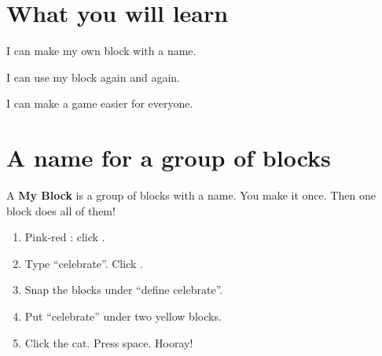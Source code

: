 
\section{What you will learn}
\begin{ican}
  \item I can make my own block with a name.
  \item I can use my block again and again.
  \item I can make a game easier for everyone.
\end{ican}

\section{A name for a group of blocks}
A \textbf{My Block} is a group of blocks with a name. You make it once. Then one block does all of them!

\begin{exercise}
\begin{enumerate}[leftmargin=1.4em,itemsep=2pt]
  \item Pink-red : click .
  \item Type \enquote{celebrate}. Click .
  \item Snap the blocks under \enquote{define celebrate}.
  \item Put \enquote{celebrate} under two yellow  blocks.
  \item Click the cat. Press space. Hooray!
\end{enumerate}
\begin{center}
\begin{scratch}[scale=0.8]
\end{scratch}
\quad
\begin{scratch}[scale=0.8]
\end{scratch}
\quad
\begin{scratch}[scale=0.8]
\end{scratch}
\end{center}
\end{exercise}


